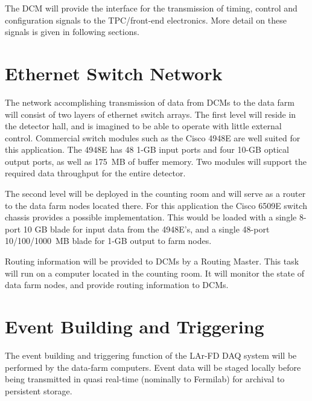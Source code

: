 The DCM will provide the interface for the transmission of 
timing, control and configuration signals to the TPC/front-end electronics.
More detail on these signals is given in following sections.

\section{Ethernet Switch Network}
\label{sec:v5-trig-switch}

The network accomplishing transmission of data from DCMs to the data 
farm will consist of two layers of ethernet switch arrays.  
The first level will reside in the detector hall, and is imagined to be 
able to operate with little external control.  Commercial switch modules 
such as the Cisco 4948E are well suited for this application.  The 4948E 
has 48 1-GB input ports and four 10-GB optical output ports, 
as well as 175~MB of buffer memory.  Two modules will support the 
required data throughput for the entire detector.

The second level will be deployed in the counting room and will 
serve as a router to the data farm nodes located there.  For this application 
the Cisco 6509E switch chassis provides a possible implementation.  This 
would be loaded with a single 8-port 10 GB blade for input data from the 
4948E's, and a single 48-port 10/100/1000~MB blade for 1-GB output to 
farm nodes.

Routing information will be provided to DCMs by a Routing Master.  This 
task will run on a computer located in the counting room.  It will monitor 
the state of data farm nodes, and provide routing information to DCMs.


\section{Event Building and Triggering}
\label{sec:v5-trig-evtbuild}

The event building and triggering function of the LAr-FD DAQ system 
will be performed by the data-farm computers.  Event data will be staged 
locally before being transmitted in quasi real-time (nominally to Fermilab) 
for archival to persistent storage. 

